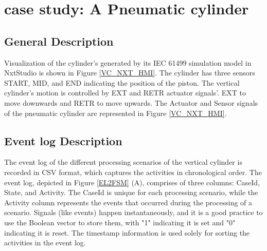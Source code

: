 \documentclass{ieeeojies}
\begin{document}
\section{case study: A Pneumatic cylinder}
\label{cs}
\subsection{General Description}

Visualization of the cylinder's generated by its IEC 61499 simulation model in NxtStudio is shown in Figure \ref{VC_NXT_HMI}.  The cylinder has three sensors START, MID, and END indicating the position of the piston. The vertical cylinder's motion is controlled by EXT and RETR actuator signals'. EXT  to move downwards and RETR  to move upwards. The Actuator and Sensor signals of the pneumatic cylinder are represented in Figure \ref{VC_NXT_HMI}.

\subsection{Event log Description}


The event log of the different processing scenarios of the vertical cylinder is recorded in CSV format, which captures the activities in chronological order. The event log, depicted in Figure \ref{EL2FSM} (A), comprises of three columns: CaseId, State, and Activity. The CaseId is unique for each processing scenario, while the Activity column represents the events that occurred during the processing of a scenario. Signals (like events) happen instantaneously, and it is a good practice to use the Boolean vector to store them, with "1" indicating it is set and "0" indicating it is reset. The timestamp information is used solely for sorting the activities in the event log.
\end{document}
